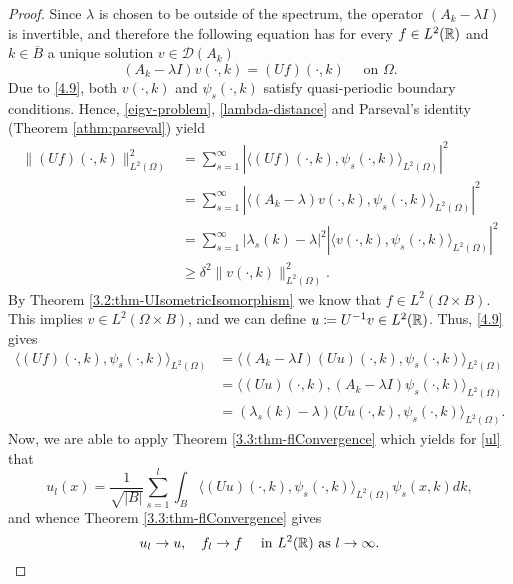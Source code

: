 \begin{theorem}
\begin{proof}
		Since $\lambda$ is chosen to be outside of the spectrum, the operator $(A_{k} - \lambda I)$ is invertible, and therefore the following equation has for every $f \in L^{2}(\mathbb{R})$ and $k \in \overline{B}$ a unique solution $v \in \mathcal{D}(A_{k})$
		\begin{equation}
			(A_{k} - \lambda I) v(\cdot, k) = (Uf)(\cdot, k) \quad \text{ on } \Omega. \label{4.9}			
		\end{equation}
		Due to \eqref{4.9}, both $v(\cdot, k)$ and $\psi_{s}(\cdot, k)$ satisfy quasi-periodic boundary conditions. Hence, \eqref{eigv-problem}, \eqref{lambda-distance} and Parseval's identity (Theorem \ref{athm:parseval}) yield
		\begin{align*}
			\| (Uf)(\cdot, k)\|^{2}_{L^{2}(\Omega)} & = \sum_{s=1}^{\infty} |\langle (Uf)(\cdot, k), \psi_{s}(\cdot, k)\rangle_{L^{2}(\Omega)}|^{2} \\
			& = \sum_{s=1}^{\infty}|\langle (A_{k} - \lambda) v(\cdot, k), \psi_{s}(\cdot, k)\rangle_{L^{2}(\Omega)}|^{2} \\
			& = \sum_{s=1}^{\infty} |\lambda_{s}(k) - \lambda|^{2} |\langle v(\cdot, k), \psi_{s}(\cdot, k)\rangle_{L^{2}(\Omega)}|^{2} \\
			& \geq \delta^{2} \| v(\cdot, k)\|^{2}_{L^{2}(\Omega)}.
		\end{align*}
		By Theorem \ref{3.2:thm-UIsometricIsomorphism} we know that $f \in L^{2}(\Omega \times B)$. This implies $v \in L^{2}(\Omega \times B)$, and we can define $u \coloneqq U^{-1} v \in L^{2}(\mathbb{R})$. Thus, \eqref{4.9} gives
			\begin{align*}
				\langle (Uf)(\cdot, k), \psi_{s}(\cdot, k) \rangle_{L^{2}(\Omega)} & = \langle (A_{k} - \lambda I)(Uu)(\cdot, k), \psi_{s}(\cdot, k) \rangle_{L^{2}(\Omega)} \\
					& = \langle (Uu)(\cdot,k), (A_{k} - \lambda I) \psi_{s}(\cdot, k) \rangle_{L^{2}(\Omega)} \\
					& = (\lambda_{s}(k) - \lambda) \langle Uu(\cdot, k), \psi_{s}(\cdot, k) \rangle_{L^{2}(\Omega)}.
			\end{align*}
		Now, we are able to apply Theorem \ref{3.3:thm-flConvergence} which yields for \eqref{ul} that
			\[ u_{l}(x) = \frac{1}{\sqrt{|B|}} \sum_{s=1}^{l} \int_{B} \langle (Uu)(\cdot, k), \psi_{s}(\cdot, k)\rangle_{L^{2}(\Omega)} \psi_{s}(x, k) dk, \]
		and whence Theorem \ref{3.3:thm-flConvergence} gives
			\begin{equation}
				u_{l} \rightarrow u, \quad f_{l} \rightarrow f \quad \text{ in } L^{2}(\R) \text{ as } l \rightarrow \infty. \label{ulflconvergence}

\end{equation}
\end{proof}
\end{theorem}
